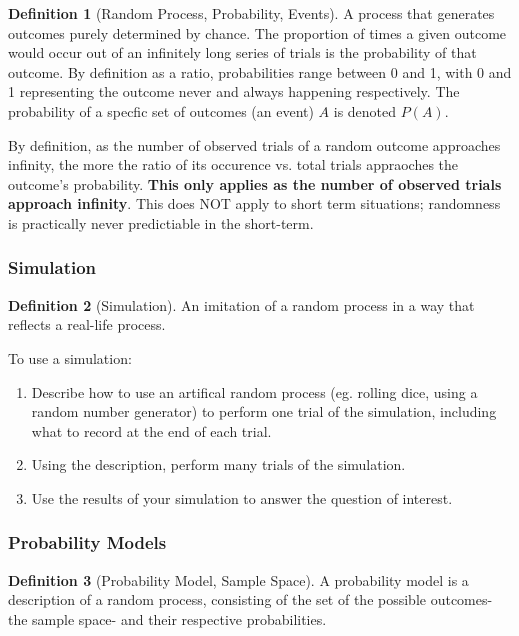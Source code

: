 \documentclass[12pt, a4paper]{article}
\theoremstyle{definition}
\newtheorem{definition}{Definition}
\begin{document}
\begin{definition}[Random Process, Probability, Events]
    A process that generates outcomes purely determined by chance.
    The proportion of times a given outcome would occur out of an infinitely long series of trials is the probability of that outcome.
    By definition as a ratio, probabilities range between 0 and 1, with 0 and 1 representing the outcome never and always happening respectively.
    The probability of a specfic set of outcomes (an event) $A$ is denoted $P(A)$.
\end{definition}

By definition, as the number of observed trials of a random outcome approaches infinity, the more the ratio of its occurence vs. total trials appraoches the outcome's probability.
\textbf{This only applies as the number of observed trials approach infinity}.
This does NOT apply to short term situations; randomness is practically never predictiable in the short-term.

\subsubsection{Simulation}

\begin{definition}[Simulation]
    An imitation of a random process in a way that reflects a real-life process.
\end{definition}

To use a simulation:
\begin{enumerate}
    \item Describe how to use an artifical random process (eg. rolling dice, using a random number generator) to perform one trial of the simulation, including what to record at the end of each trial.
    \item Using the description, perform many trials of the simulation.
    \item Use the results of your simulation to answer the question of interest.
\end{enumerate}

\subsubsection{Probability Models}

\begin{definition}[Probability Model, Sample Space]
    A probability model is a description of a random process, consisting of the set of the possible outcomes- the sample space- and their respective probabilities.
\end{definition}
\end{document}
